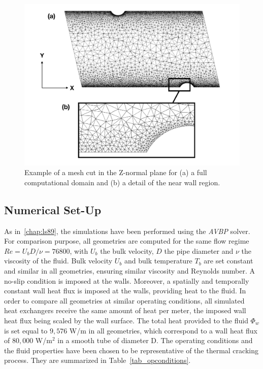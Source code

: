 \begin{figure}[ht]
\centering
\includegraphics[width=\linewidth]{fig/applications/optim/mert_mesh2.pdf}
\caption{Example of a mesh cut in the Z-normal plane for (a) a full computational domain and (b) a detail of the near wall region.}
\label{mesh}
\end{figure}

\subsection{Numerical Set-Up}

As in~\cref{chap:ls89}, the simulations have been performed using the \emph{AVBP} solver. For comparison purpose, all geometries are computed for the same flow regime $Re = U_b D / \nu = 76800$, with $U_b$ the bulk velocity, $D$ the pipe diameter and $\nu$ the viscosity of the fluid. Bulk velocity $U_b$ and bulk temperature $T_b$ are set constant and similar in all geometries, ensuring similar viscosity and Reynolds number. A no-slip condition is imposed at the walls. Moreover, a spatially and temporally constant wall heat flux is imposed at the walls, providing heat to the fluid. In order to compare all geometries at similar operating conditions, all simulated heat exchangers receive the same amount of heat per meter, the imposed wall heat flux being scaled by the wall surface. The total heat provided to the fluid $\Phi_w$ is set equal to $9,576$ W/m in all geometries, which correspond to a wall heat flux of $80,000$ W/m$^2$ in a smooth tube of diameter D. The operating conditions and the fluid properties have been chosen to be representative of the thermal cracking process. They are summarized in Table~\ref{tab_opconditions}.

